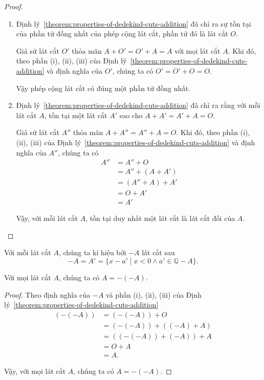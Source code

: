 \begin{proof}
    \begin{enumerate}[label={(\roman*)}]
        \item Định lý~\ref{theorem:properties-of-dedekind-cuts-addition} đã chỉ ra sự tồn tại của phần tử đồng nhất của phép cộng lát cắt, phần tử đó là lát cắt $O$.

              Giả sử lát cắt $O'$ thỏa mãn $A + O' = O' + A = A$ với mọi lát cắt $A$. Khi đó, theo phần (i), (ii), (iii) của Định lý~\ref{theorem:properties-of-dedekind-cuts-addition} và định nghĩa của $O'$, chúng ta có $O' = O' + O = O$.

              Vậy phép cộng lát cắt có đúng một phần tử đồng nhất.
        \item Định lý~\ref{theorem:properties-of-dedekind-cuts-addition} đã chỉ ra rằng với mỗi lát cắt $A$, tồn tại một lát cắt $A'$ sao cho $A + A' = A' + A = O$.

              Giả sử lát cắt $A''$ thỏa mãn $A + A'' = A'' + A = O$. Khi đó, theo phần (i), (ii), (iii) của Định lý~\ref{theorem:properties-of-dedekind-cuts-addition} và định nghĩa của $A''$, chúng ta có
              \begin{align*}
                  A'' & = A'' + O        \\
                      & = A'' + (A + A') \\
                      & = (A'' + A) + A' \\
                      & = O + A'         \\
                      & = A'
              \end{align*}

              Vậy, với mỗi lát cắt $A$, tồn tại duy nhất một lát cắt là lát cắt đối của $A$.
    \end{enumerate}
\end{proof}

Với mỗi lát cắt $A$, chúng ta kí hiệu bởi $-A$ lát cắt sau
\[
    -A = A' = \{ x - a' \mid x < 0 \wedge a'\in \mathbb{Q} - A \}.
\]

\begin{theorem}\label{theorem:additive-inversion-is-involutive}
    Với mọi lát cắt $A$, chúng ta có $A = -(-A)$.
\end{theorem}

\begin{proof}
    Theo định nghĩa của $-A$ và phần (i), (ii), (iii) của Định lý~\ref{theorem:properties-of-dedekind-cuts-addition}
    \begin{align*}
        (-(-A)) & = (-(-A)) + O          \\
                & = (-(-A)) + ((-A) + A) \\
                & = ((-(-A)) + (-A)) + A \\
                & = O + A                \\
                & = A.
    \end{align*}

    Vậy, với mọi lát cắt $A$, chúng ta có $A = -(-A)$.
\end{proof}


